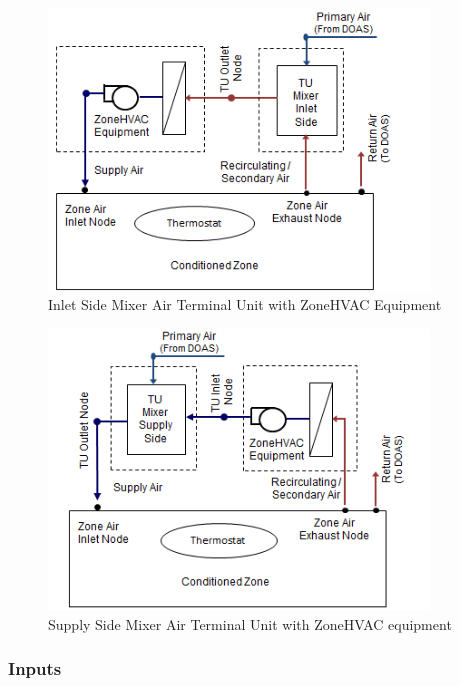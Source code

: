 \begin{figure}[hbtp] %
\centering
\includegraphics[width=0.9\textwidth, height=0.9\textheight, keepaspectratio=true]{media/image275.png}
\caption{Inlet Side Mixer Air Terminal Unit with ZoneHVAC Equipment \protect \label{fig:inlet-side-mixer-air-terminal-unit-with-ZoneHVAC-equipment}}
\end{figure}
\begin{figure}[hbtp] %
\centering
\includegraphics[width=0.9\textwidth, height=0.9\textheight, keepaspectratio=true]{media/image276.png}
\caption{Supply Side Mixer Air Terminal Unit with ZoneHVAC equipment \protect \label{fig:supply-side-mixer-air-terminal-unit-with-ZoneHVAC-equipment}}
\end{figure}



\subsubsection{Inputs}\label{inputs-12-000}

